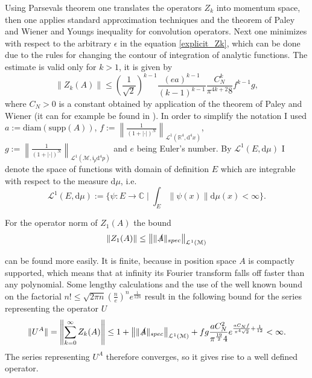 \documentclass[b5paper,draft,openbib,12pt]{memoir}
\begin{document}
Using Parsevals theorem one translates the operators \(Z_k\) into momentum space, then one applies standard approximation techniques and the theorem of Paley and Wiener and Youngs inequality for convolution operators. Next one minimizes with respect to the arbitrary \(\epsilon\) in the equation \eqref{explicit_Zk}, which can be done due to the rules for changing the contour of integration of analytic functions. The estimate is valid only for \(k>1\), it is given by
\begin{equation}
\|Z_k(A)\|\le \left(\frac{1}{\sqrt{2} }\right)^{k-1} \frac{\left(e a\right)^{k-1}}{(k-1)^{k-1}} \frac{ C_N^k}{\pi^{4k+2}8}  f^{k-1}  g,
\end{equation}
where \(C_N>0\) is a constant obtained by application of the theorem of Paley and Wiener (it can for example be found in \cite{reed1975methods}). In order to simplify the notation I used \(a:=\text{diam}(\text{supp}(A))\), \(f:=\left\|\frac{1}{(1+|\cdot |)^N} \right\|_{\mathcal{L}^1(\mathbb{R}^4, \mathrm{d}^4x)}\), \(g:=\left\|\frac{1}{(1+|\cdot |)^N} \right\|_{\mathcal{L}^1(\mathcal{M},\mathfrak{i}_p \mathrm{d}^4p)} \) and \(e\) being Euler's number. By \(\mathcal{L}^1(E, \mathrm{d}\mu )\) I denote the space of functions with domain of definition \(E\) which are integrable with respect to the measure \(\mathrm{d}\mu\), i.e.
\begin{equation}
\mathcal{L}^1(E, \mathrm{d}\mu ):=\{ \psi: E\rightarrow \mathbb{C}  \mid \int_E \|\psi (x)\| \mathrm{d}\mu (x)< \infty \}.
\end{equation}

For the operator norm of \(Z_1 (A)\) the bound
\begin{equation}
\|Z_1(A)\|\le \left\| \|\slashed{A}\|_{spec} \right\|_{\mathcal{L}^1(\mathcal{M})}
\end{equation}

can be found more easily. It is finite, because in position space \(A\) is compactly supported, which means that at infinity its Fourier transform falls off faster than any polynomial.
Some lengthy calculations and the use of the well known bound on the factorial \(n!\le \sqrt{2\pi n} \left(\frac{n}{e}\right)^n e^\frac{1}{12n}\)  result in the following bound for the series representing the operator \(U\)
\begin{multline}
\|U^A\|=\left\|\sum_{k=0}^\infty Z_k(A) \right\|
\le  1+ \left\| \|\slashed{A}\|_{spec} \right\|_{\mathcal{L}^1(\mathcal{M})} + f g \frac{a    C^2_N }{\pi^{\frac{19}{2}}4}
 e^{\frac{a C_N f}{\pi^4\sqrt{2}}+\frac{1}{12}} <\infty.
\end{multline}
The series representing \(U^A\) therefore converges, so it gives rise to a well defined operator.
\end{document}
